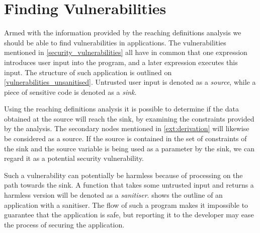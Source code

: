 \section{Finding Vulnerabilities}\label{theory_finding_vulns}
Armed with the information provided by the reaching definitions analysis we should be able to find vulnerabilities in applications.
The vulnerabilities mentioned in \cref{security_vulnerabilities} all have in common that one expression introduces user input into the program, and a later expression executes this input.
The structure of such application is outlined on \cref{vulnerabilities_unsanitised}.
Untrusted user input is denoted as a \emph{source}, while a piece of sensitive code is denoted as a \emph{sink}.

Using the reaching definitions analysis it is possible to determine if the data obtained at the source will reach the sink, by examining the constraints provided by the analysis.
The secondary nodes mentioned in \cref{ext:derivation} will likewise be considered as a source.
If the source is contained in the set of constraints of the sink and the source variable is being used as a parameter by the sink, we can regard it as a potential security vulnerability.

Such a vulnerability can potentially be harmless because of processing on the path towards the sink.
A function that takes some untrusted input and returns a harmless version will be denoted as a \emph{sanitiser}.
 shows the outline of an application with a sanitiser.
The flow of such a program makes it impossible to guarantee that the application is safe, but reporting it to the developer may ease the process of securing the application.

